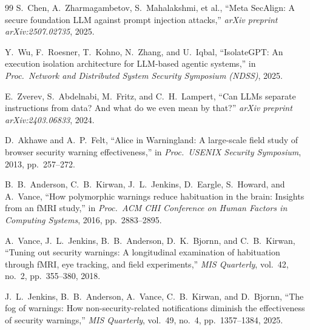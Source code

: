\documentclass[10pt,twocolumn,letterpaper]{article}
\begin{document}
\begin{thebibliography}{99}
S.~Chen, A.~Zharmagambetov, S.~Mahalakshmi, et al., ``Meta SecAlign: A secure foundation LLM against prompt injection attacks,'' \emph{arXiv preprint arXiv:2507.02735}, 2025.

Y.~Wu, F.~Roesner, T.~Kohno, N.~Zhang, and U.~Iqbal, ``IsolateGPT: An execution isolation architecture for LLM-based agentic systems,'' in \emph{Proc.\ Network and Distributed System Security Symposium (NDSS)}, 2025.

E.~Zverev, S.~Abdelnabi, M.~Fritz, and C.~H.~Lampert, ``Can LLMs separate instructions from data? And what do we even mean by that?'' \emph{arXiv preprint arXiv:2403.06833}, 2024.

D.~Akhawe and A.~P.~Felt, ``Alice in Warningland: A large-scale field study of browser security warning effectiveness,'' in \emph{Proc.\ USENIX Security Symposium}, 2013, pp.~257--272.

B.~B.~Anderson, C.~B.~Kirwan, J.~L.~Jenkins, D.~Eargle, S.~Howard, and A.~Vance, ``How polymorphic warnings reduce habituation in the brain: Insights from an fMRI study,'' in \emph{Proc.\ ACM CHI Conference on Human Factors in Computing Systems}, 2016, pp.~2883--2895.

A.~Vance, J.~L.~Jenkins, B.~B.~Anderson, D.~K.~Bjornn, and C.~B.~Kirwan, ``Tuning out security warnings: A longitudinal examination of habituation through fMRI, eye tracking, and field experiments,'' \emph{MIS Quarterly}, vol.~42, no.~2, pp.~355--380, 2018.

J.~L.~Jenkins, B.~B.~Anderson, A.~Vance, C.~B.~Kirwan, and D.~Bjornn, ``The fog of warnings: How non-security-related notifications diminish the effectiveness of security warnings,'' \emph{MIS Quarterly}, vol.~49, no.~4, pp.~1357--1384, 2025.

\end{thebibliography}
\end{document}

